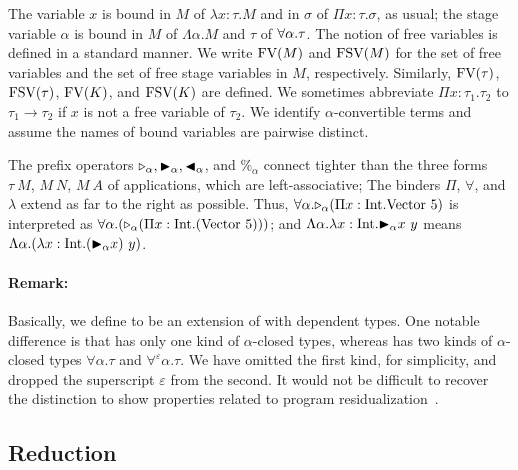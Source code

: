 The variable $x$ is bound in $M$ of $\lambda x:\tau.M$ and in $\sigma$
of $\Pi x:\tau.\sigma$, as usual; the stage variable $\alpha$ is
bound in $M$ of $\Lambda \alpha.M$ and $\tau$ of $\forall\alpha.\tau$.
The notion of free variables is defined in a standard manner.
We write $\text{FV}(M)$ and $\text{FSV}(M)$ for the set of free variables and the set of free stage variables in $M$, respectively.  Similarly, $\text{FV}(\tau)$, $\text{FSV}(\tau)$,
$\text{FV}(K)$, and $\text{FSV}(K)$ are defined.
We sometimes abbreviate $\Pi x:\tau_1.\tau_2$ to $\tau_1 \rightarrow \tau_2$ if
$x$ is not a free variable of $\tau_2$.
We identify $\alpha$-convertible terms and assume the names of bound variables are pairwise distinct.

The prefix operators ${\mathop{\triangleright}}_\alpha, {\mathop{\blacktriangleright}}_\alpha, {\mathop{\blacktriangleleft}}_\alpha$, and
$\%_\alpha$ connect tighter than the three forms $\tau\ M$, $M\ N$,
$M\ A$ of applications, which are left-associative; The binders $\Pi$,
$\forall$, and $\lambda$ extend as far to the right as possible.
Thus, $\F\alpha.\TW_{\alpha} (\Pi x:\I.\text{Vector}\ 5)$ is
interpreted as
$\F\alpha.(\TW_{\alpha} (\Pi x:\I.(\text{Vector}\ 5)))$; and
$\Lambda\alpha.\lambda x:\textrm{Int}.{\mathop{\blacktriangleright}}_\alpha x\ y$ means
$\Lambda\alpha.(\lambda x:\I.(\TB_\alpha x)\ y)$.

\paragraph{Remark:} Basically, we define \LMD to be an extension of
\LTP with dependent types.  One notable difference is that \LMD has
only one kind of \(\alpha\)-closed types, whereas \LTP has two kinds
of \(\alpha\)-closed types \(\forall\alpha.\tau\) and
\(\forall^\varepsilon\alpha.\tau\).  We have omitted the first kind,
for simplicity, and dropped the superscript $\varepsilon$ from the second.  It would
not be difficult to recover the distinction to show properties related
to program residualization~\cite{Hanada2014}.


\subsection{Reduction}


